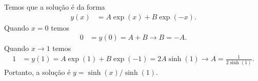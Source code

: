 \documentclass[a4paper,12pt, leqno, answers]{exam}
\begin{document}
\begin{questions}
\begin{parts}
\begin{solution}


            Temos que a solu\c{c}\~{a}o \'{e} da forma
            \begin{align*}
                y(x) &= A \exp(x) + B \exp(-x).
            \end{align*}
            Quando $x = 0$ temos
            \begin{align*}
                0 &= y(0) = A + B \to B = - A.
            \end{align*}
            Quando $x \to 1$ temos
            \begin{align*}
                1 &= y(1) = A \exp(1) + B \exp(-1) = 2 A \sinh(1) \to A = \frac{1}{2 \sinh(1)}.
            \end{align*}
            Portanto, a solu\c{c}\~{a}o \'{e} $y = \sinh(x) / \sinh(1)$.
        \end{solution}


\end{parts}
\end{questions}
\end{document}
